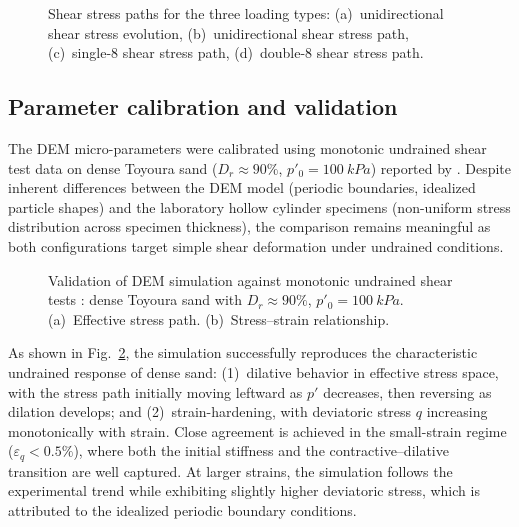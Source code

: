 \begin{figure}
  \centering
  \hfill
  \hfill
  \hfill
  \caption{Shear stress paths for the three loading types:
    (a)~unidirectional shear stress evolution,
    (b)~unidirectional shear stress path,
    (c)~single-8 shear stress path,
    (d)~double-8 shear stress path.}
  \label{fig:stress_paths}
\end{figure}


\subsection{Parameter calibration and validation}
\label{subsec:calibration_validation}

The DEM micro-parameters were calibrated using monotonic undrained shear test data on dense Toyoura sand ($D_r \approx 90\%$, $p'_0 = \SI{100}{kPa}$) reported by \citet{Nakata1998}. Despite inherent differences between the DEM model (periodic boundaries, idealized particle shapes) and the laboratory hollow cylinder specimens (non-uniform stress distribution across specimen thickness), the comparison remains meaningful as both configurations target simple shear deformation under undrained conditions.

\begin{figure}
  \centering
  \hfill
  \caption{Validation of DEM simulation against monotonic undrained shear tests
    \citep{Nakata1998}: dense Toyoura sand with $D_r \approx 90\%$,
    $p'_0 = \SI{100}{kPa}$.
    (a)~Effective stress path. (b)~Stress--strain relationship.}
  \label{fig:validation}
\end{figure}

As shown in Fig.~\ref{fig:validation}, the simulation successfully reproduces the characteristic undrained response of dense sand: (1)~dilative behavior in effective stress space, with the stress path initially moving leftward as $p'$ decreases, then reversing as dilation develops; and (2)~strain-hardening, with deviatoric stress $q$ increasing monotonically with strain. Close agreement is achieved in the small-strain regime ($\varepsilon_q < 0.5\%$), where both the initial stiffness and the contractive--dilative transition are well captured. At larger strains, the simulation follows the experimental trend while exhibiting slightly higher deviatoric stress, which is attributed to the idealized periodic boundary conditions.



